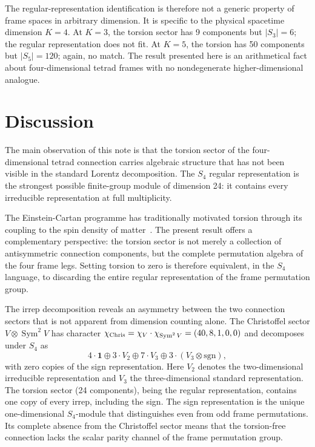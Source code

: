 \documentclass[11pt]{article}
\newcommand{\Sym}{\operatorname{Sym}}
\begin{document}
The regular-representation identification is therefore not a
generic property of frame spaces in arbitrary dimension.  It is
specific to the physical spacetime dimension $K=4$.  At $K=3$, the
torsion sector has 9 components but $|S_3|=6$; the regular
representation does not fit.  At $K=5$, the torsion has 50
components but $|S_5|=120$; again, no match.  The result presented
here is an arithmetical fact about four-dimensional tetrad frames
with no nondegenerate higher-dimensional analogue.


\section{Discussion}

The main observation of this note is that the torsion sector of the
four-dimensional tetrad connection carries algebraic structure that
has not been visible in the standard Lorentz decomposition.  The
$S_4$ regular representation is the strongest possible finite-group
module of dimension 24: it contains every irreducible
representation at full multiplicity.

The Einstein-Cartan programme has traditionally motivated torsion
through its coupling to the spin density of
matter~\cite{Hehl1976}.  The present result offers a complementary
perspective: the torsion sector is not merely a collection of
antisymmetric connection components, but the complete permutation
algebra of the four frame legs.  Setting torsion to zero is
therefore equivalent, in the $S_4$ language, to discarding the
entire regular representation of the frame permutation group.

The irrep decomposition reveals an asymmetry between the two
connection sectors that is not apparent from dimension counting
alone.  The Christoffel sector $V\otimes\Sym^2V$ has character
$\chi_{\rm Chris}=\chi_V\cdot\chi_{\Sym^2V}=(40,8,1,0,0)$ and
decomposes under $S_4$ as
\[
        4\cdot\mathbf{1}
        \oplus 3\cdot V_2
        \oplus 7\cdot V_3
        \oplus 3\cdot (V_3\otimes\mathrm{sgn}),
\]
with zero copies of the sign representation.  Here $V_2$ denotes
the two-dimensional irreducible representation and $V_3$ the
three-dimensional standard representation.  The torsion sector
(24 components), being the regular representation, contains one
copy of every irrep, including the sign.  The sign representation
is the unique one-dimensional $S_4$-module that distinguishes even
from odd frame permutations.  Its complete absence from the
Christoffel sector means that the torsion-free connection lacks the
scalar parity channel of the frame permutation group.
\end{document}
